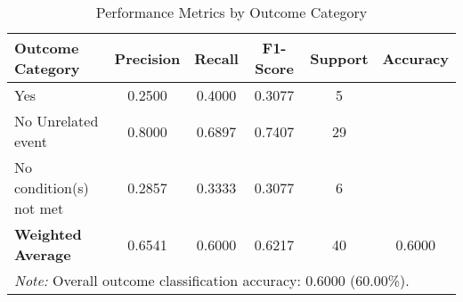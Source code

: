 \begin{table}[H]
\centering
\caption{Performance Metrics by Outcome Category}
\label{tab:classification_metrics}
\begin{tabular}{lccccc}
\toprule
\textbf{Outcome Category} & \textbf{Precision} & \textbf{Recall} & \textbf{F1-Score} & \textbf{Support} & \textbf{Accuracy} \\
\midrule
Yes & 0.2500 & 0.4000 & 0.3077 & 5 & \multirow{1}{*}{} \\
No \- Unrelated event & 0.8000 & 0.6897 & 0.7407 & 29 & \multirow{1}{*}{} \\
No \- condition(s) not met & 0.2857 & 0.3333 & 0.3077 & 6 & \multirow{1}{*}{} \\
\midrule
\textbf{Weighted Average} & 0.6541 & 0.6000 & 0.6217 & 40 & 0.6000 \\
\bottomrule
\multicolumn{6}{p{14cm}}{\textit{Note:} Overall outcome classification accuracy: 0.6000 (60.00\%).} \\
\end{tabular}
\end{table}
